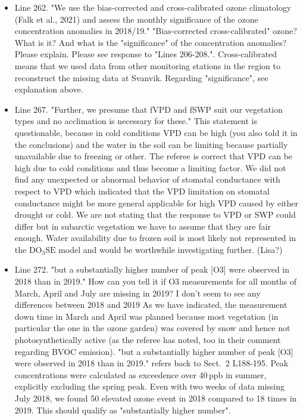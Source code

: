 \documentclass{scrartcl}
\begin{document}
\begin{itemize}
\item {\color{blue}Line 262. "We use the bias-corrected and cross-calibrated ozone climatology (Falk et al., 2021) and assess the monthly significance of the ozone concentration anomalies in 2018/19." 
"Bias-corrected cross-calibrated" ozone? What is it? And what is the "significance" of the concentration anomalies? Please explain.}
Please see response to "Lines 206-208.". Cross-calibrated means that we used data from other monitoring stations in the region to reconstruct the missing data at Svanvik. Regarding "significance", see explanation above.

\item {\color{blue}Line 267. "Further, we presume that fVPD and fSWP suit our vegetation types and no acclimation is necessary for these." This statement is questionable, because in cold conditions VPD can be high (you also told
it in the conclusions) and the water in the soil can be limiting because partially unavailable due to freezing or other.}
The referee is correct that VPD can be high due to cold conditions and thus become a limiting factor. We did not find any unexpected or abnormal behavior of stomatal conductance with respect to VPD which indicated that the VPD limitation on stomatal conductance might be more general applicable for high VPD caused by either drought or cold. We are not stating that the response to VPD or SWP could differ but in subarctic vegetation we have to assume that they are fair enough. Water availability due to frozen soil is most likely not represented in the $\mathrm{DO_3SE}$ model and would be worthwhile investigating further. (Lisa?)

\item {\color{blue}Line 272. "but a substantially higher number of peak [O3] were observed in 2018 than in 2019." How can you tell it if O3 measurements for all months of March, April and July are missing in 2019? I don't seem to see any differences between 2018 and 2019}
As we have indicated, the measurement down time in March and April was planned because most vegetation (in particular the one in the ozone garden) was covered by snow and hence not photosynthetically active (as the referee has noted, too in their comment regarding BVOC emission). "but a substantially higher number of peak [O3] were observed in 2018 than in 2019." refers back to Sect.~2 L188-195. Peak concentrations were calculated as exceedence over 40\,ppb in summer, explicitly excluding the spring peak. Even with two weeks of data missing July 2018, we found 50 elevated ozone event in 2018 compared to 18 times in 2019. This should qualify as "substantially higher number".


\end{itemize}
\end{document}
